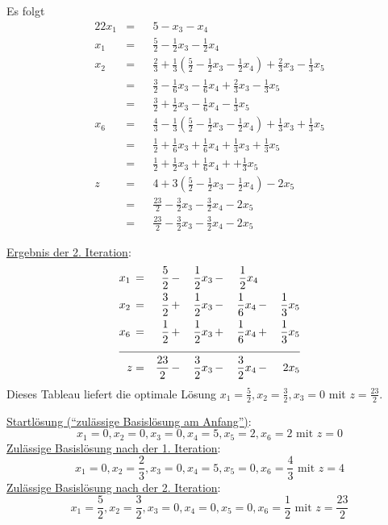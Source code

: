 \documentclass[10pt,a4paper,oneside,ngerman,numbers=noenddot]{scrartcl}
\begin{document}
		Es folgt
		\begin{alignat*}{2}
			2x_{1} &=&& 5 - x_{3} - x_{4} \\
			x_{1} &=&& \frac{5}{2} - \frac{1}{2}x_{3} - \frac{1}{2}x_{4} \\
			x_{2} &=&& \frac{2}{3} + \frac{1}{3}\left(\frac{5}{2} - \frac{1}{2}x_{3} - \frac{1}{2}x_{4}\right) + \frac{2}{3}x_{3} - \frac{1}{3}x_{5} \\
			&=&& \frac{3}{2} - \frac{1}{6}x_{3} - \frac{1}{6}x_{4} + \frac{2}{3}x_{3} - \frac{1}{3}x_{5} \\
			&=&& \frac{3}{2} + \frac{1}{2}x_{3} - \frac{1}{6}x_{4} - \frac{1}{3}x_{5} \\
			x_{6} &=&& \frac{4}{3} - \frac{1}{3}\left(\frac{5}{2} - \frac{1}{2}x_{3} - \frac{1}{2}x_{4}\right) + \frac{1}{3}x_{3} + \frac{1}{3}x_{5} \\
			&=&& \frac{1}{2} + \frac{1}{6}x_{3} + \frac{1}{6}x_{4} + \frac{1}{3}x_{3} + \frac{1}{3}x_{5} \\
			&=&& \frac{1}{2} + \frac{1}{2}x_{3} + \frac{1}{6}x_{4} + + \frac{1}{3}x_{5} \\
			z &=&& 4 + 3\left(\frac{5}{2} - \frac{1}{2}x_{3} - \frac{1}{2}x_{4}\right) - 2x_{5} \\
			&=&& \frac{23}{2} - \frac{3}{2}x_{3} - \frac{3}{2}x_{4} - 2x_{5} \\
			&=&& \frac{23}{2} - \frac{3}{2}x_{3} - \frac{3}{2}x_{4} - 2x_{5}
		\end{alignat*}
		
		\underline{Ergebnis der 2. Iteration}:
		\begin{alignat*}{5}
			x_{1} \,&=&\, \frac{5}{2} \,&-&\, \frac{1}{2}x_{3} \,&-&\, \frac{1}{2}x_{4} && \\
			x_{2} \,&=&\, \frac{3}{2} \,&+&\, \frac{1}{2}x_{3} \,&-&\, \frac{1}{6}x_{4} \,&-&\, \frac{1}{3}x_{5} \\
			x_{6} \,&=&\, \frac{1}{2} \,&+&\, \frac{1}{2}x_{3} \,&+&\, \frac{1}{6}x_{4} \,&+&\, \frac{1}{3}x_{5} \\ \cline{1 - 9}
			z &=& \frac{23}{2} \,&-&\, \frac{3}{2}x_{3} \,&-&\, \frac{3}{2}x_{4} \,&-&\, 2x_{5}
		\end{alignat*}
		Dieses Tableau liefert die optimale Lösung $x_{1} = \frac{5}{2}, x_{2} = \frac{3}{2}, x_{3} = 0$ mit $z = \frac{23}{2}$.
		
		\underline{Startlösung ("`zulässige Basislösung am Anfang"')}:
		\[
			x_{1} = 0, x_{2} = 0, x_{3} = 0, x_{4} = 5, x_{5} = 2, x_{6} = 2  \text{ mit } z = 0
		\]
		\underline{Zulässige Basislösung nach der 1. Iteration}:
		\[
			x_{1} = 0, x_{2} = \frac{2}{3}, x_{3} = 0, x_{4} = 5, x_{5} = 0, x_{6} = \frac{4}{3} \text{ mit } z = 4
		\]
		\underline{Zulässige Basislösung nach der 2. Iteration}:
		\[
			x_{1} = \frac{5}{2}, x_{2} = \frac{3}{2}, x_{3} = 0, x_{4} = 0, x_{5} = 0, x_{6} = \frac{1}{2} \text{ mit } z = \frac{23}{2}
		\]
\end{document}
